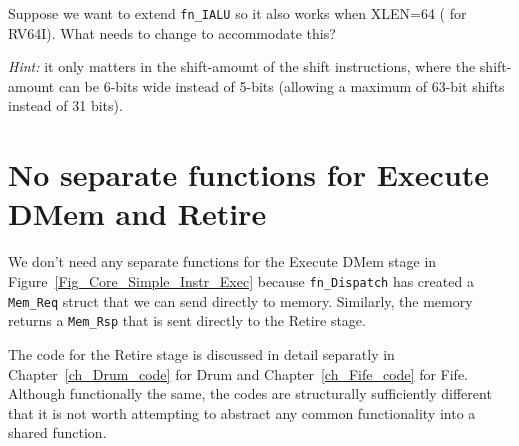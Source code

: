 Suppose we want to extend {\tt fn\_IALU} so it also works when XLEN=64
({\ie} for RV64I).  What needs to change to accommodate this?

\emph{Hint:} it only matters in the shift-amount of the shift
instructions, where the shift-amount can be 6-bits wide instead of
5-bits (allowing a maximum of 63-bit shifts instead of 31 bits).

\Endexercise


\section{No separate functions for Execute DMem and Retire}

We don't need any separate functions for the Execute DMem stage in
Figure~\ref{Fig_Core_Simple_Instr_Exec} because \verb|fn_Dispatch| has
created a \verb|Mem_Req| struct that we can send directly to memory.
Similarly, the memory returns a \verb|Mem_Rsp| that is sent directly
to the Retire stage.

The code for the Retire stage is discussed in detail separatly in
Chapter~\ref{ch_Drum_code} for Drum and Chapter~\ref{ch_Fife_code} for
Fife.  Although functionally the same, the codes are structurally
sufficiently different that it is not worth attempting to abstract any
common functionality into a shared function.

